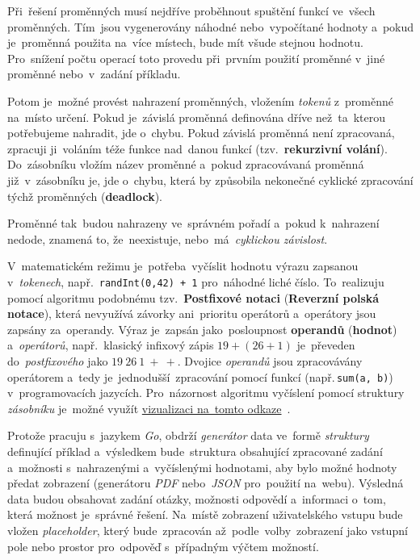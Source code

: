 \documentclass[11pt,a4paper]{report}
\begin{document}
            Při~řešení proměnných musí nejdříve proběhnout spuštění funkcí ve~všech proměnných. Tím~jsou vygenerovány náhodné nebo~vypočítané hodnoty a~pokud je~proměnná použita na~více místech, bude mít všude stejnou hodnotu. Pro~snížení počtu operací toto provedu při~prvním použití proměnné v~jiné proměnné nebo~v~zadání příkladu.

            Potom je~možné provést nahrazení proměnných, vložením \emph{tokenů} z~proměnné na~místo určení. Pokud je~závislá proměnná definována dříve než~ta~kterou potřebujeme nahradit, jde o~chybu. Pokud závislá proměnná není zpracovaná, zpracuji ji~voláním téže funkce nad~danou funkcí (tzv.~\textbf{rekurzivní volání}). Do~zásobníku vložím název proměnné a~pokud zpracovávaná proměnná již~v~zásobníku je, jde o~chybu, která by způsobila nekonečné cyklické zpracování týchž proměnných (\textbf{deadlock}).
            
            Proměnné tak~budou nahrazeny ve~správném pořadí a~pokud k~nahrazení nedode, znamená to, že~neexistuje, nebo~má~\emph{cyklickou závislost}.

            V~matematickém režimu je~potřeba~vyčíslit hodnotu výrazu zapsanou v~\emph{tokenech}, např.~\texttt{randInt(0,42) + 1} pro~náhodné liché číslo. To~realizuju pomocí algoritmu podobnému tzv.~\textbf{Postfixové notaci} (\textbf{Reverzní polská notace}), která nevyužívá závorky ani~prioritu operátorů a~operátory jsou zapsány za~operandy. Výraz je~zapsán jako~posloupnost \textbf{operandů} (\textbf{hodnot}) a~\emph{operátorů}, např.~klasický infixový zápis $19 + ( 26 + 1 )$ je~převeden do~\emph{postfixového} jako $19\:26\:1\:+\:+$. Dvojice \emph{operandů} jsou zpracovávány operátorem a~tedy je~jednodušší~zpracování pomocí funkcí (např.\,\texttt{sum(a, b)}) v~programovacích jazycích. Pro~názornost algoritmu vyčíslení pomocí struktury \emph{zásobníku} je~možné využít \href{https://www.free-online-calculator-use.com/postfix-evaluator.html#}{vizualizaci na~tomto odkaze}~\cite{postfixnotation}.

            Protože pracuju s~jazykem \emph{Go}, obdrží \emph{generátor} data ve~formě \emph{struktury} definující příklad a~výsledkem bude~struktura obsahující zpracované zadání a~možnosti s~nahrazenými a~vyčíslenými hodnotami, aby bylo možné hodnoty předat zobrazení (generátoru \emph{PDF} nebo~\emph{JSON} pro~použití na~webu). Výsledná data budou obsahovat zadání otázky, možnosti odpovědí a~informaci o~tom, která možnost je~správné řešení. Na~místě zobrazení uživatelského vstupu bude vložen \emph{placeholder}, který bude~zpracován až~podle~volby~zobrazení jako vstupní pole nebo prostor pro~odpověď s~případným výčtem možností.
            
\end{document}
